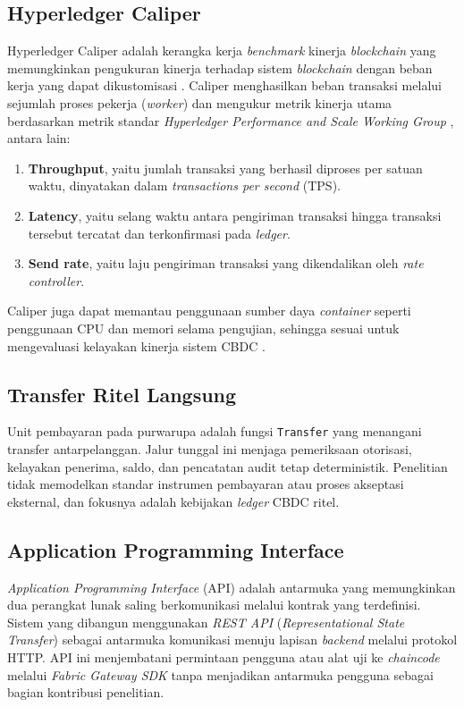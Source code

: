 

\subsection{Hyperledger Caliper}

Hyperledger Caliper adalah kerangka kerja \textit{benchmark} kinerja
\textit{blockchain} yang memungkinkan pengukuran kinerja terhadap sistem
\textit{blockchain} dengan beban kerja yang dapat dikustomisasi
\cite{hlf_caliper}. Caliper menghasilkan beban transaksi melalui sejumlah
proses pekerja (\textit{worker}) dan mengukur metrik kinerja utama berdasarkan
metrik standar \textit{Hyperledger Performance and Scale Working Group}
\cite{hlf_metrics}, antara lain:
\begin{enumerate}
    \item \textbf{Throughput}, yaitu jumlah transaksi yang berhasil diproses per
    satuan waktu, dinyatakan dalam \textit{transactions per second} (TPS).
    \item \textbf{Latency}, yaitu selang waktu antara pengiriman transaksi hingga
    transaksi tersebut tercatat dan terkonfirmasi pada \textit{ledger}.
    \item \textbf{Send rate}, yaitu laju pengiriman transaksi yang dikendalikan
    oleh \textit{rate controller}.
\end{enumerate}
Caliper juga dapat memantau penggunaan sumber daya \textit{container} seperti
penggunaan CPU dan memori selama pengujian, sehingga sesuai untuk mengevaluasi
kelayakan kinerja sistem CBDC \cite{fabric_perf2023}.

\subsection{Transfer Ritel Langsung}

Unit pembayaran pada purwarupa adalah fungsi \texttt{Transfer} yang menangani
transfer antarpelanggan. Jalur tunggal ini menjaga pemeriksaan otorisasi,
kelayakan penerima, saldo, dan pencatatan audit tetap deterministik.
Penelitian tidak memodelkan standar instrumen pembayaran
atau proses akseptasi eksternal, dan fokusnya adalah kebijakan \textit{ledger} CBDC ritel.

\subsection{Application Programming Interface}

\textit{Application Programming Interface} (API) adalah antarmuka yang
memungkinkan dua perangkat lunak saling berkomunikasi melalui kontrak yang
terdefinisi. Sistem yang dibangun menggunakan \textit{REST API}
(\textit{Representational State Transfer}) \cite{fielding2000rest} sebagai antarmuka komunikasi menuju
lapisan \textit{backend} melalui protokol HTTP. API ini menjembatani permintaan
pengguna atau alat uji ke \textit{chaincode} melalui \textit{Fabric Gateway SDK}
tanpa menjadikan antarmuka pengguna sebagai bagian kontribusi penelitian.

